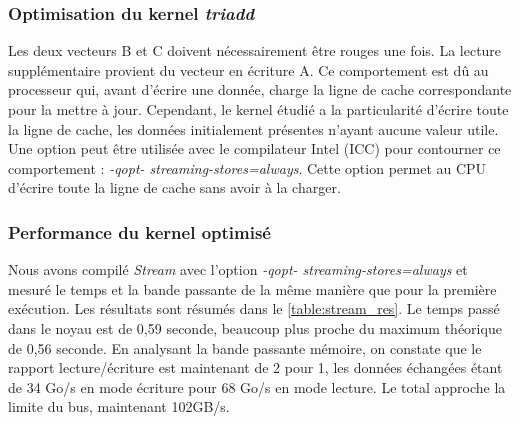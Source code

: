 \subsubsection{Optimisation du kernel \textit{triadd}}

Les deux vecteurs B et C doivent nécessairement être rouges une fois. La lecture supplémentaire provient du vecteur en écriture A. Ce comportement est dû au processeur qui, avant d'écrire une donnée, charge la ligne de cache correspondante pour la mettre à jour. Cependant, le kernel étudié a la particularité d'écrire toute la ligne de cache, les données initialement présentes n'ayant aucune valeur utile. Une option peut être utilisée avec le compilateur Intel (ICC) pour contourner ce comportement : \textit{-qopt- streaming-stores=always}. Cette option permet au CPU d'écrire toute la ligne de cache sans avoir à la charger.


\subsubsection{Performance du kernel optimisé}

Nous avons compilé \textit{Stream} avec l'option \textit{-qopt- streaming-stores=always} et mesuré le temps et la bande passante de la même manière que pour la première exécution. Les résultats sont résumés dans le \autoref{table:stream_res}. Le temps passé dans le noyau est de 0,59 seconde, beaucoup plus proche du maximum théorique de 0,56 seconde. En analysant la bande passante mémoire, on constate que le rapport lecture/écriture est maintenant de 2 pour 1, les données échangées étant de 34 Go/s en mode écriture pour 68 Go/s en mode lecture. Le total approche la limite du bus, maintenant 102GB/s.

 \renewcommand{\arraystretch}{1.2}
    \setlength{\tabcolsep}{8pt}
    
